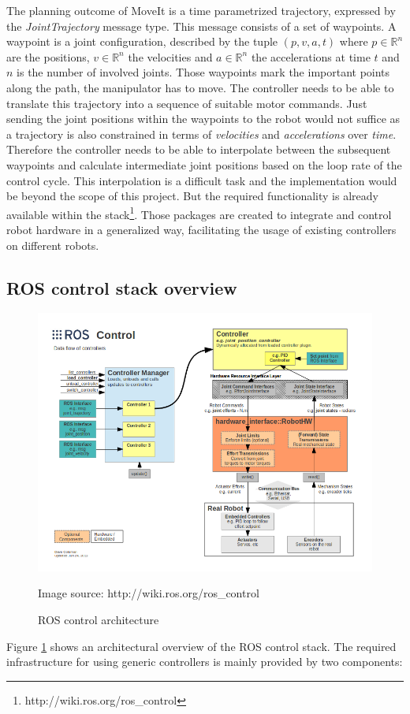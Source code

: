 The planning outcome of MoveIt is a time parametrized trajectory, expressed by the \emph{JointTrajectory} message type. This message consists of a set of waypoints. A waypoint is a joint configuration, described by the tuple $(p,v,a,t)$ where $p \in \mathbb{R}^n$ are the positions, $v \in \mathbb{R}^n$ the velocities and $a \in \mathbb{R}^n$ the accelerations at time $t$ and $n$ is the number of involved joints. Those waypoints mark the important points along the path, the manipulator has to move. The controller needs to be able to translate this trajectory into a sequence of suitable motor commands. Just sending the joint positions within the waypoints to the robot would not suffice as a trajectory is also constrained in terms of \emph{velocities} and \emph{accelerations} over \emph{time}. Therefore the controller needs to be able to interpolate between the subsequent waypoints and calculate intermediate joint positions based on the loop rate of the control cycle. This interpolation is a difficult task and the implementation would be beyond the scope of this project. But the required functionality is already available within the  stack\footnote{http://wiki.ros.org/ros\_control}. Those packages are created to integrate and control robot hardware in a generalized way, facilitating the usage of existing controllers on different robots. 

\subsection{ROS control stack overview}

\begin{figure}
	\centering
  	\includegraphics[width=1.0\textwidth]{images/ros_control.png}
	\caption{ROS control architecture}
	{\scriptsize Image source: http://wiki.ros.org/ros\_control}
	\label{fig:ros_control}
\end{figure}
Figure \ref{fig:ros_control} shows an architectural overview of the ROS control stack. The required infrastructure for using generic controllers is mainly provided by two components:

